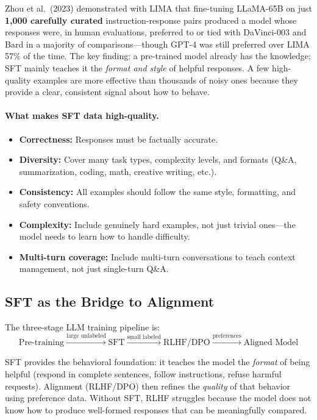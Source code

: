 \begin{keyinsight}
Zhou et al.\ (2023) demonstrated with LIMA that fine-tuning LLaMA-65B on just
\textbf{1,000 carefully curated} instruction-response pairs produced a model
whose responses were, in human evaluations, preferred to or tied with
DaVinci-003 and Bard in a majority of comparisons---though GPT-4 was still
preferred over LIMA 57\% of the time.  The
key finding: a pre-trained model already has the knowledge; SFT mainly teaches
it the \emph{format and style} of helpful responses.  A few high-quality
examples are more effective than thousands of noisy ones because they provide a
clear, consistent signal about how to behave.
\end{keyinsight}

\paragraph{What makes SFT data high-quality.}
\begin{itemize}
    \item \textbf{Correctness:} Responses must be factually accurate.
    \item \textbf{Diversity:} Cover many task types, complexity levels, and
          formats (Q\&A, summarization, coding, math, creative writing, etc.).
    \item \textbf{Consistency:} All examples should follow the same style,
          formatting, and safety conventions.
    \item \textbf{Complexity:} Include genuinely hard examples, not just
          trivial ones---the model needs to learn how to handle difficulty.
    \item \textbf{Multi-turn coverage:} Include multi-turn conversations to
          teach context management, not just single-turn Q\&A.
\end{itemize}

\subsection{SFT as the Bridge to Alignment}

The three-stage LLM training pipeline is:
\[
    \text{Pre-training} \xrightarrow{\text{large unlabeled}} \text{SFT}
    \xrightarrow{\text{small labeled}} \text{RLHF/DPO}
    \xrightarrow{\text{preferences}} \text{Aligned Model}
\]

SFT provides the behavioral foundation: it teaches the model the
\emph{format} of being helpful (respond in complete sentences, follow
instructions, refuse harmful requests).  Alignment (RLHF/DPO) then refines
the \emph{quality} of that behavior using preference data.  Without SFT, RLHF
struggles because the model does not know how to produce well-formed responses
that can be meaningfully compared.


